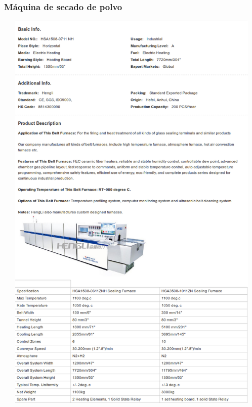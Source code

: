 \subsubsection{Máquina de secado de polvo}
\includegraphics[width=15cm,height=20cm,keepaspectratio]{Datasheets/1Horno.png} 
\newpage

